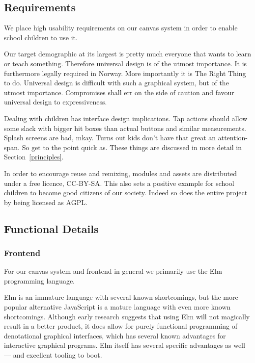 \subsection{Requirements}
We place high usability requirements on our canvas system in order to enable
school children to use it.

Our target demographic at its largest is pretty much everyone that wants to 
learn or teach something. Therefore universal design is of the utmost 
importance. It is furthermore legally required in Norway\cite{uuforskrift}. 
More importantly it is The Right Thing to do. Universal design is difficult 
with such a graphical system, but of the utmost importance. Compromises shall 
err on the side of caution and favour universal design to expressiveness.

Dealing with children has interface design implications. Tap actions should 
allow some slack with bigger hit boxes than actual buttons and similar 
measurements. Splash screens are bad, mkay. Turns out kids don't have that 
great an attention-span. So get to the point quick as. These things are 
discussed in more detail in Section~\ref{principles}.

In order to encourage reuse and remixing, modules and assets are distributed 
under a free licence, CC-BY-SA\@. This also sets a positive example for school 
children to become good citizens of our society. Indeed so does the entire 
project by being licensed as AGPL\@\cite{educational}.

\subsection{Functional Details}
\subsubsection{Frontend}
For our canvas system and frontend in general we primarily use the Elm 
programming language\cite{czaplicki2012elm}.

Elm is an immature language with several known 
shortcomings\cite{smitsextreme}, but the more popular alternative JavaScript 
is a mature language with even more known 
shortcomings\cite{flanagan2006javascript}. Although early research suggests 
that using Elm will not magically result in a better 
product\cite{buist2014extending}, it does allow for purely functional 
programming of denotational graphical interfaces\cite{czaplicki2012elm}, which 
has several known advantages for interactive graphical 
programs\cite{berntsen2014quest}. Elm itself has several specific advantages 
as well --- and excellent tooling to boot\cite{kraeutmann2015functional}.

